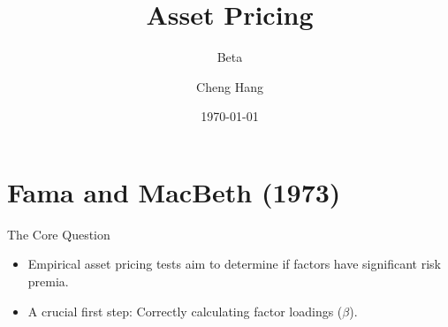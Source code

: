 \documentclass[10pt]{beamer}
\title[Asset Pricing]{\textbf{Asset Pricing}} %
\subtitle{Beta}
\author[Cheng Hang]{Cheng Hang} %
\institute[DUFE] %
{School of Fintech \\
Dongbei University of Finance \& Economics \\ %
\medskip
\textbf{chenghangch@qq.com}%
}
\date{\today} %
\begin{document}
\begin{frame}
\titlepage %
\end{frame}


\section{Fama and MacBeth (1973)}

\begin{frame}{The Core Question}
  \begin{itemize}
    \item Empirical asset pricing tests aim to determine if factors have significant risk premia.
    \item A crucial first step: Correctly calculating factor loadings ($\beta$).
  \end{itemize}
\end{frame}
\end{document}
